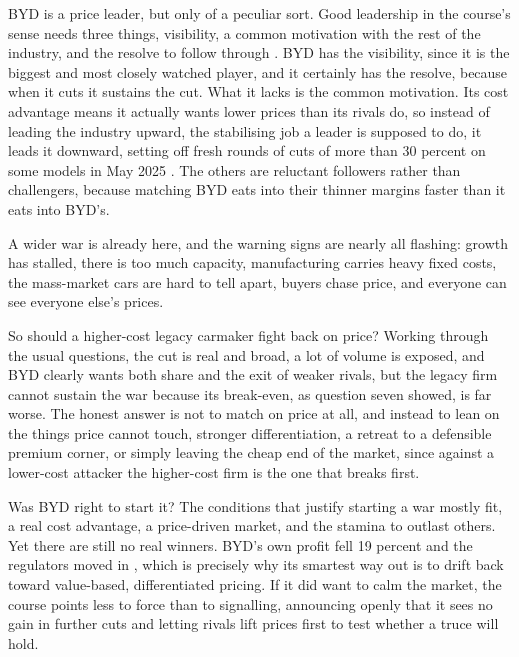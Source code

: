 
BYD is a price leader, but only of a peculiar sort. Good leadership in the course's sense needs three things, visibility, a common motivation with the rest of the industry, and the resolve to follow through \cite{nagle2018}. BYD has the visibility, since it is the biggest and most closely watched player, and it certainly has the resolve, because when it cuts it sustains the cut. What it lacks is the common motivation. Its cost advantage means it actually wants lower prices than its rivals do, so instead of leading the industry upward, the stabilising job a leader is supposed to do, it leads it downward, setting off fresh rounds of cuts of more than 30 percent on some models in May 2025 \cite{restofworldWar}. The others are reluctant followers rather than challengers, because matching BYD eats into their thinner margins faster than it eats into BYD's.

A wider war is already here, and the warning signs are nearly all flashing: growth has stalled, there is too much capacity, manufacturing carries heavy fixed costs, the mass-market cars are hard to tell apart, buyers chase price, and everyone can see everyone else's prices.

So should a higher-cost legacy carmaker fight back on price? Working through the usual questions, the cut is real and broad, a lot of volume is exposed, and BYD clearly wants both share and the exit of weaker rivals, but the legacy firm cannot sustain the war because its break-even, as question seven showed, is far worse. The honest answer is not to match on price at all, and instead to lean on the things price cannot touch, stronger differentiation, a retreat to a defensible premium corner, or simply leaving the cheap end of the market, since against a lower-cost attacker the higher-cost firm is the one that breaks first.

Was BYD right to start it? The conditions that justify starting a war mostly fit, a real cost advantage, a price-driven market, and the stamina to outlast others. Yet there are still no real winners. BYD's own profit fell 19 percent and the regulators moved in \cite{byd2025}, which is precisely why its smartest way out is to drift back toward value-based, differentiated pricing. If it did want to calm the market, the course points less to force than to signalling, announcing openly that it sees no gain in further cuts and letting rivals lift prices first to test whether a truce will hold.
